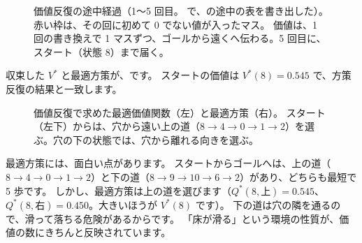 \begin{figure}[tbp]
\centering
{}
\caption{価値反復の途中経過（1〜5 回目。 で、の途中の表を書き出した）。
赤い枠は、その回に初めて 0 でない値が入ったマス。
価値は、1 回の書き換えで 1 マスずつ、ゴールから遠くへ伝わる。5 回目に、スタート（状態 8）まで届く。}
\label{fig:rlb-vi-sweeps}
\end{figure}

収束した $V^\ast$ と最適方策が、です。
スタートの価値は $V^\ast(8)=0.545$ で、方策反復の結果と一致します。

\begin{figure}[tbp]
\centering
{}
\caption{価値反復で求めた最適価値関数（左）と最適方策（右）。
スタート（左下）からは、穴から遠い上の道（$8\to4\to0\to1\to2$）を選ぶ。穴の下の状態では、穴から離れる向きを選ぶ。}
\label{fig:rlb-v-star}
\end{figure}

最適方策には、面白い点があります。
スタートからゴールへは、上の道（$8\to4\to0\to1\to2$）と下の道（$8\to9\to10\to6\to2$）があり、どちらも最短で 5 歩です。
しかし、最適方策は上の道を選びます（$Q^\ast(8,\text{上})=0.545$、$Q^\ast(8,\text{右})=0.450$。大きいほうが $V^\ast(8)$ です）。
下の道は穴の隣を通るので、滑って落ちる危険があるからです。
「床が滑る」という環境の性質が、価値の数にきちんと反映されています。

